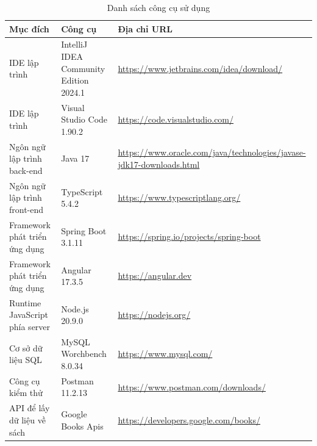 \documentclass[../DoAn.tex]{subfiles}
\begin{document}
\begin{table}[H]
\centering{}
    \begin{tabular}{|>{\raggedright\arraybackslash}m{4cm}|>{\raggedright\arraybackslash}m{5cm}|>{\raggedright\arraybackslash}m{6cm}|}
        \hline
        \textbf{Mục đích}         & \textbf{Công cụ}                     & \textbf{Địa chỉ URL}          \\ \hline
        IDE lập trình             & IntelliJ IDEA Community Edition 2024.1 & \url{https://www.jetbrains.com/idea/download/} \\ \hline
        IDE lập trình             & Visual Studio Code 1.90.2            & \url{https://code.visualstudio.com/} \\ \hline
        Ngôn ngữ lập trình back-end        & Java 17                              & \url{https://www.oracle.com/java/technologies/javase-jdk17-downloads.html} \\ \hline
        Ngôn ngữ lập trình front-end        & TypeScript 5.4.2                              & \url{https://www.typescriptlang.org/} \\ \hline
        Framework phát triển ứng dụng & Spring Boot 3.1.11                & \url{https://spring.io/projects/spring-boot} \\ \hline
        Framework phát triển ứng dụng & Angular 17.3.5 \cite{jain2014angularjs} & \url{https://angular.dev} \\ \hline
        Runtime JavaScript phía server & Node.js 20.9.0                   & \url{https://nodejs.org/}             \\ \hline
        Cơ sở dữ liệu SQL & MySQL Worchbench 8.0.34 & \url{https://www.mysql.com/} \\ \hline
        Công cụ kiểm thử & Postman 11.2.13 & \url{https://www.postman.com/downloads/} \\ \hline
        API để lấy dữ liệu về sách & Google Books Apis & \url{https://developers.google.com/books/} \\ \hline
        \end{tabular}
        \caption{Danh sách công cụ sử dụng}
        \label{table:tools_used}
    \end{table}
    
\end{document}
